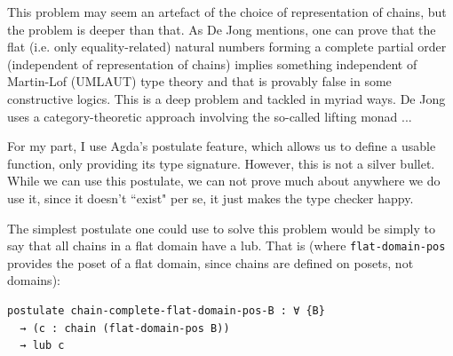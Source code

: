 \documentclass[12pt,a4paper,twoside,openright]{report}
\begin{document}
This problem may seem an artefact of the choice of representation of chains, but the problem is deeper than that. As De Jong mentions, one can prove that the flat (i.e. only equality-related) natural numbers forming a complete partial order (independent of representation of chains) implies something independent of Martin-Lof (UMLAUT) type theory and that is provably false in some constructive logics. This is a deep problem and tackled in myriad ways. De Jong uses a category-theoretic approach involving the so-called lifting monad ...


For my part, I use Agda's postulate feature, which allows us to define a usable function, only providing its type signature. However, this is not a silver bullet. While we can use this postulate, we can not prove much about anywhere we do use it, since it doesn't ``exist" per se, it just makes the type checker happy. 

The simplest postulate one could use to solve this problem would be simply to say that all chains in a flat domain have a lub. That is (where \texttt{flat-domain-pos} provides the poset of a flat domain, since chains are defined on posets, not domains):
\begin{verbatim}
postulate chain-complete-flat-domain-pos-B : ∀ {B} 
  → (c : chain (flat-domain-pos B)) 
  → lub c
\end{verbatim}
\end{document}

